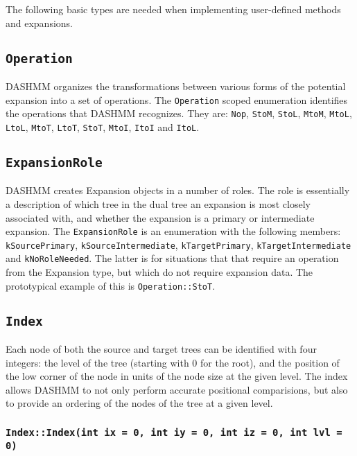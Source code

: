 The following basic types are needed when implementing user-defined methods and
expansions.

\subsection{\texttt{Operation}}

DASHMM organizes the transformations between various forms of the potential
expansion into a set of operations. The \texttt{Operation} scoped enumeration
identifies the operations that DASHMM recognizes. They are: \texttt{Nop},
\texttt{StoM}, \texttt{StoL}, \texttt{MtoM}, \texttt{MtoL}, \texttt{LtoL},
\texttt{MtoT}, \texttt{LtoT}, \texttt{StoT}, \texttt{MtoI}, \texttt{ItoI}
and \texttt{ItoL}.

\subsection{\texttt{ExpansionRole}}

DASHMM creates Expansion objects in a number of roles. The role is essentially
a description of which tree in the dual tree an expansion is most closely
associated with, and whether the expansion is a primary or intermediate
expansion.  The \texttt{ExpansionRole} is an enumeration with the following
members: \texttt{kSourcePrimary}, \texttt{kSourceIntermediate},
\texttt{kTargetPrimary}, \texttt{kTargetIntermediate} and
\texttt{kNoRoleNeeded}. The latter is for situations that that require an
operation from the Expansion type, but which do not require expansion data.
The prototypical example of this is \texttt{Operation::StoT}. 

\subsection{\texttt{Index}}

Each node of both the source and target trees can be identified with four
integers: the level of the tree (starting with 0 for the root), and the
position of the low corner of the node in units of the node size at the given
level. The index allows DASHMM to not only perform accurate positional
comparisions, but also to provide an ordering of the nodes of the tree at a
given level.

\subsubsection{\texttt{Index::Index(int ix = 0, int iy = 0, int iz = 0, int lvl = 0)}}

